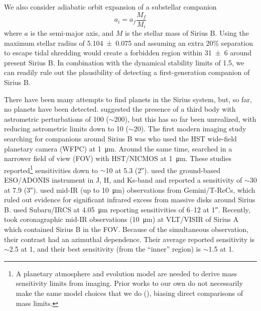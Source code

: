 \documentclass[twocolumn]{aastex631}
\begin{document}
We also consider adiabatic orbit expansion of a substellar companion
\begin{equation}
a_i = a_f \frac{M_{f}}{M_{i}}
\end{equation}
where $a$ is the semi-major axis, and $M$ is the stellar mass of Sirius B. Using the maximum stellar radius of \qty{5.104\pm0.075}{\au} and assuming an extra 20\% separation to escape tidal shredding \citep{nordhausOrbitsLowmassCompanions2013} would create a forbidden region within \qty{31\pm6}{\au} around present Sirius B. In combination with the dynamical stability limits of \qty{1.5}{\au}, we can readily rule out the plausibility of detecting a first-generation companion of Sirius B.

There have been many attempts to find planets in the Sirius system, but, so far, no planets have been detected. \citet{benestSiriusTripleStar1995} suggested the presence of a third body with astrometric perturbations of \qty{100}{\milliarcsecond} ($\sim$\qty{200}{\jupitermass}), but this has so far been unrealized, with \citet{bondSiriusSystemIts2017} reducing astrometric limits down to \qty{10}{\milliarcsecond} ($\sim$\qty{20}{\jupitermass}). The first modern imaging study searching for companions around Sirius B was \citet{schroederSearchFaintCompanions2000} who used the HST wide-field planetary camera (WFPC) at \qty{1}{\micro\meter}. Around the same time, \citet{kuchnerSearchExozodiacalDust2000} searched in a narrower field of view (FOV) with HST/NICMOS at \qty{1}{\micro\meter}. These studies reported\footnote{A planetary atmosphere and evolution model are needed to derive mass sensitivity limits from imaging. Prior works to our own do not necessarily make the same model choices that we do (), biasing direct comparisons of mass limits.} sensitivities down to $\sim$\qty{10}{\jupitermass} at \qty{5.3}{\au} (\ang{;;2}).  \citet{bonnet-bidaudADONISHighContrast2008a} used the ground-based ESO/ADONIS instrument in J, H, and Ks-band and reported a sensitivity of $\sim$\qty{30}{\jupitermass} at \qty{7.9}{\au} (\ang{;;3}). \citet{skemerSiriusImagedMidinfrared2011} used mid-IR (up to \qty{10}{\micro\meter}) observations from Gemini/T-ReCs, which ruled out evidence for significant infrared excess from massive disks around Sirius B. \citet{thalmannPiercingGlareDirect2011} used Subaru/IRCS at \qty{4.05}{\micro\meter} reporting sensitivities of \qtyrange{6}{12}{\jupitermass} at \ang{;;1}. Recently, \citet{pathakHighContrastImaging2021} took coronagraphic mid-IR observations (\qty{10}{\micro\meter}) at VLT/VISIR of Sirius A which contained Sirius B in the FOV. Because of the simultaneous observation, their contrast had an azimuthal dependence. Their average reported sensitivity is $\sim$\qty{2.5}{\jupitermass} at \qty{1}{\au}, and their best sensitivity (from the ``inner'' region) is $\sim$\qty{1.5}{\jupitermass} at \qty{1}{\au}.
\end{document}
